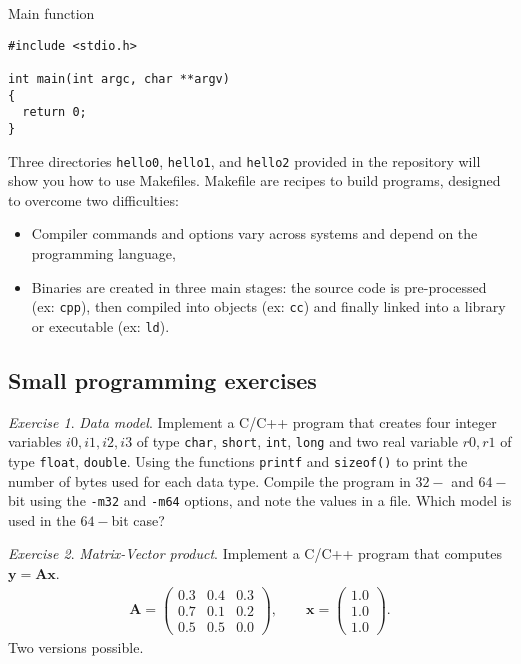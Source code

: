\documentclass[onecolumn, oneside, a4paper, 11pt]{memoir}
\theoremstyle{remark}
\newtheorem{ex}{Exercise}
\begin{document}
\begin{table}[h!]
\caption{Main function}
\centering
  \begin{lstlisting}[style=c]
#include <stdio.h>

int main(int argc, char **argv)
{
  return 0;
}
  \end{lstlisting}
\end{table}

\bigskip
Three directories \texttt{hello0}, \texttt{hello1}, and \texttt{hello2} provided in the repository will show you how to use Makefiles. Makefile are recipes to build programs, designed to overcome two difficulties:
\begin{itemize}
\item Compiler commands and options vary across systems and depend on the programming language,
\item Binaries are created in three main stages: the source code is pre-processed (ex: \texttt{cpp}), then compiled into objects (ex: \texttt{cc}) and finally linked into a library or executable (ex: \texttt{ld}).
\end{itemize}

\subsection{Small programming exercises}

\begin{ex}
\textit{Data model}. Implement a C/C++ program that creates four integer variables $i0, i1, i2, i3$ of type \texttt{char}, \texttt{short}, \texttt{int}, \texttt{long} and two real variable $r0, r1$ of type \texttt{float}, \texttt{double}.
Using the functions \texttt{printf} and \texttt{sizeof()} to print the number of bytes used for each data type.
Compile the program in $32-$ and $64-$bit using the \texttt{-m32} and \texttt{-m64} options, and note the values in a file.
Which model is used in the $64-$bit case?
\end{ex}

\begin{ex}
\textit{Matrix-Vector product}.
  Implement a C/C++ program that computes $\bm y = \bm A \bm x$.
  \begin{align*}
    \bm A =
    \begin{pmatrix}
      0.3 & 0.4 & 0.3 \\
      0.7 & 0.1 & 0.2 \\
      0.5 & 0.5 & 0.0
    \end{pmatrix}, \qquad \bm x = \begin{pmatrix} 1.0 \\ 1.0 \\ 1.0 \end{pmatrix}.
  \end{align*}
Two versions possible.
\end{ex}
\end{document}
